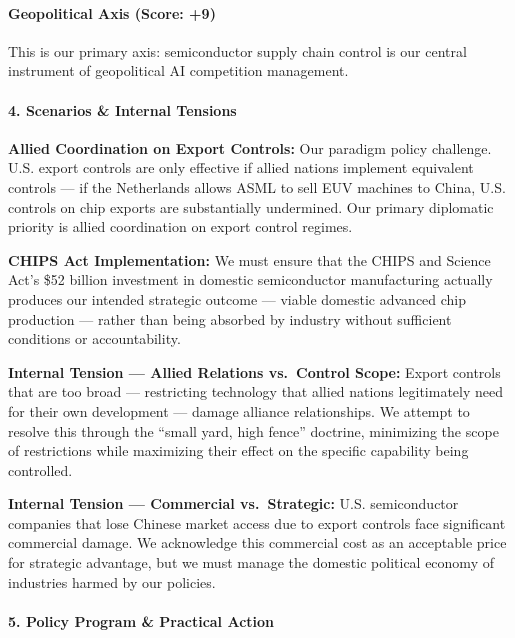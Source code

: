 \paragraph{Geopolitical Axis (Score:
+9)}\label{geopolitical-axis-score-9-2}

This is our primary axis: semiconductor supply chain control is our
central instrument of geopolitical AI competition management.

\paragraph{4. Scenarios \& Internal
Tensions}\label{scenarios-internal-tensions-24}

\textbf{Allied Coordination on Export Controls:} Our paradigm policy
challenge. U.S. export controls are only effective if allied nations
implement equivalent controls --- if the Netherlands allows ASML to sell
EUV machines to China, U.S. controls on chip exports are substantially
undermined. Our primary diplomatic priority is allied coordination on
export control regimes.

\textbf{CHIPS Act Implementation:} We must ensure that the CHIPS and
Science Act's \$52 billion investment in domestic semiconductor
manufacturing actually produces our intended strategic outcome ---
viable domestic advanced chip production --- rather than being absorbed
by industry without sufficient conditions or accountability.

\textbf{Internal Tension --- Allied Relations vs.~Control Scope:} Export
controls that are too broad --- restricting technology that allied
nations legitimately need for their own development --- damage alliance
relationships. We attempt to resolve this through the ``small yard, high
fence'' doctrine, minimizing the scope of restrictions while maximizing
their effect on the specific capability being controlled.

\textbf{Internal Tension --- Commercial vs.~Strategic:} U.S.
semiconductor companies that lose Chinese market access due to export
controls face significant commercial damage. We acknowledge this
commercial cost as an acceptable price for strategic advantage, but we
must manage the domestic political economy of industries harmed by our
policies.

\paragraph{5. Policy Program \& Practical
Action}\label{policy-program-practical-action-24}

